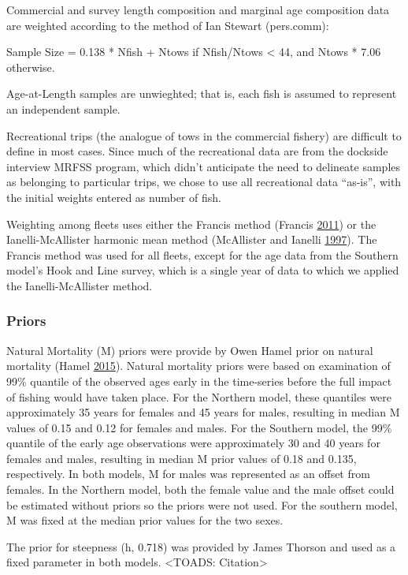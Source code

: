 \documentclass[12pt,]{article}
\begin{document}
Commercial and survey length composition and marginal age composition
data are weighted according to the method of Ian Stewart (pers.comm):

Sample Size = 0.138 * Nfish + Ntows if Nfish/Ntows \textless{} 44, and
Ntows * 7.06 otherwise.

Age-at-Length samples are unwieghted; that is, each fish is assumed to
represent an independent sample.

Recreational trips (the analogue of tows in the commercial fishery) are
difficult to define in most cases. Since much of the recreational data
are from the dockside interview MRFSS program, which didn't anticipate
the need to delineate samples as belonging to particular trips, we chose
to use all recreational data ``as-is'', with the initial weights entered
as number of fish.

Weighting among fleets uses either the Francis method (Francis
\protect\hyperlink{ref-Francis2011}{2011}) or the Ianelli-McAllister
harmonic mean method (McAllister and Ianelli
\protect\hyperlink{ref-McAllister1997}{1997}). The Francis method was
used for all fleets, except for the age data from the Southern model's
Hook and Line survey, which is a single year of data to which we applied
the Ianelli-McAllister method.

\subsubsection{Priors}\label{priors}

Natural Mortality (M) priors were provide by Owen Hamel prior on natural
mortality (Hamel \protect\hyperlink{ref-Hamel2015}{2015}). Natural
mortality priors were based on examination of 99\% quantile of the
observed ages early in the time-series before the full impact of fishing
would have taken place. For the Northern model, these quantiles were
approximately 35 years for females and 45 years for males, resulting in
median M values of 0.15 and 0.12 for females and males. For the Southern
model, the 99\% quantile of the early age observations were
approximately 30 and 40 years for females and males, resulting in median
M prior values of 0.18 and 0.135, respectively. In both models, M for
males was represented as an offset from females. In the Northern model,
both the female value and the male offset could be estimated without
priors so the priors were not used. For the southern model, M was fixed
at the median prior values for the two sexes.

The prior for steepness (h, 0.718) was provided by James Thorson and
used as a fixed parameter in both models. \textless{}TOADS:
Citation\textgreater{}
\end{document}
